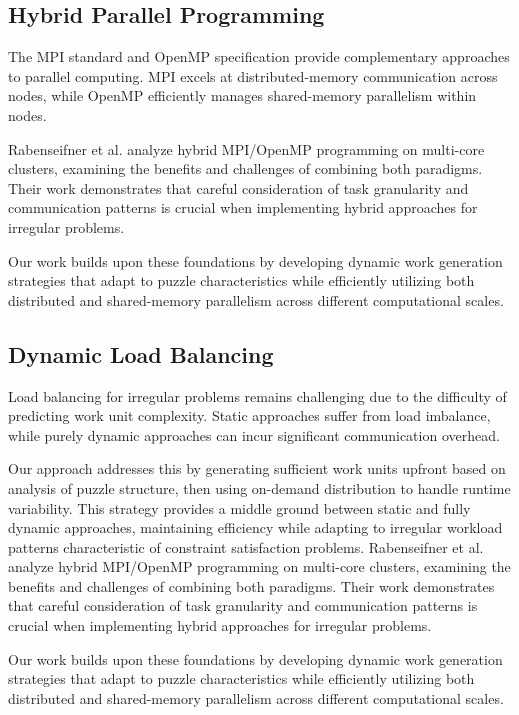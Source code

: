 \subsection{Hybrid Parallel Programming}
\label{subsec:hybrid_programming}
The MPI standard \cite{MPIForum2021} and OpenMP specification \cite{OpenMP2020} provide complementary approaches to parallel computing. MPI excels at distributed-memory communication across nodes, while OpenMP efficiently manages shared-memory parallelism within nodes.

Rabenseifner et al. \cite{Rabenseifner2009} analyze hybrid MPI/OpenMP programming on multi-core clusters, examining the benefits and challenges of combining both paradigms. Their work demonstrates that careful consideration of task granularity and communication patterns is crucial when implementing hybrid approaches for irregular problems.

Our work builds upon these foundations by developing dynamic work generation strategies that adapt to puzzle characteristics while efficiently utilizing both distributed and shared-memory parallelism across different computational scales.

\subsection{Dynamic Load Balancing}
\label{subsec:dynamic_load_balancing}
Load balancing for irregular problems remains challenging due to the difficulty of predicting work unit complexity. Static approaches suffer from load imbalance, while purely dynamic approaches can incur significant communication overhead.

Our approach addresses this by generating sufficient work units upfront based on analysis of puzzle structure, then using on-demand distribution to handle runtime variability. This strategy provides a middle ground between static and fully dynamic approaches, maintaining efficiency while adapting to irregular workload patterns characteristic of constraint satisfaction problems.
Rabenseifner et al. \cite{Rabenseifner2009} analyze hybrid MPI/OpenMP programming on multi-core clusters, examining the benefits and challenges of combining both paradigms. Their work demonstrates that careful consideration of task granularity and communication patterns is crucial when implementing hybrid approaches for irregular problems.

Our work builds upon these foundations by developing dynamic work generation strategies that adapt to puzzle characteristics while efficiently utilizing both distributed and shared-memory parallelism across different computational scales.

